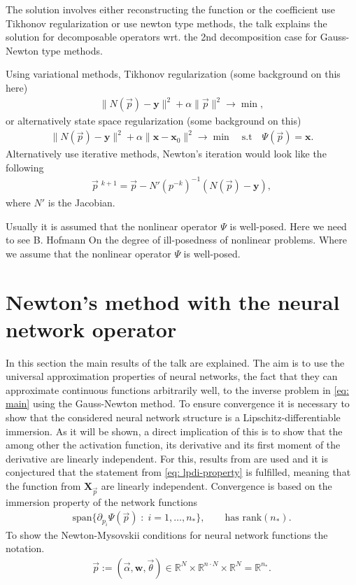The solution involves either reconstructing the function or the coefficient use
Tikhonov regularization or use newton type methods, the talk explains the
solution for decomposable operators wrt. the 2nd decomposition case for
Gauss-Newton type methods.

Using variational methods, Tikhonov regularization (some background on this
here)
\begin{align}
    \|N(\vec{p}) - \mathbf{y}\|^{2} + \alpha \|\vec{p}\|^{2} \to \min,
\end{align}
or alternatively state space regularization (some background on this)
\begin{align}
    \|N(\vec{p}) - \mathbf{y}\|^{2}
    + \alpha \|\mathbf{x} - \mathbf{x}_0\|^{2}
    \to \min \quad \text{s.t} \quad \Psi(\vec{p}) = \mathbf{x}.
\end{align}
Alternatively use iterative methods, Newton's iteration would look like the
following
\begin{align}
    \vec{p}\;^{k+1} = \vec{p} - N'\left(p^{-k}\right)^{-1}\left(N(\vec{p}) -
    \mathbf{y}  \right),
\end{align}
where $N'$ is the Jacobian.

Usually it is assumed that the nonlinear operator $\Psi$ is well-posed.
Here we need to see B. Hofmann On the degree of ill-posedness of nonlinear
problems. Where we assume that the nonlinear operator $\Psi$ is well-posed.


\section{Newton's method with the neural network operator}
In this section the main results of the talk are explained. The aim is to use
the universal approximation properties of neural networks, the fact that they
can approximate continuous functions arbitrarily well, to the inverse problem
in \ref{eq: main} using the Gauss-Newton method. To ensure convergence it is
necessary to show that the considered neural network structure is a
Lipschitz-differentiable immersion. As it will be shown, a direct implication
of this is to show that the among other the activation function, its
derivative and its first moment of the derivative are linearly independent.
For this, results from \cite{lamperski_2022} are used and it is conjectured
that the statement from \ref{eq: lpdi-property} is fulfilled, meaning that
the function from $\mathbf{X}_{\vec{p}}$ are linearly independent.
\newline
Convergence is based on the immersion property of the network functions
\begin{align}
    \text{span}\{\partial_{p_i}\Psi(\vec{p})\;:\;i=1,\ldots,n_*\}, \qquad
    \text{has rank}(n_*).
\end{align}
To show the Newton-Mysovskii conditions for neural network functions the
notation.
\begin{align}
    \vec{p} := (\vec{\alpha}, \mathbf{w}, \vec{\theta}) \in
    \mathbb{R}^{N}\times \mathbb{R}^{n\cdot N} \times \mathbb{R}^{N} =
    \mathbb{R}^{n_*}.
\end{align}

